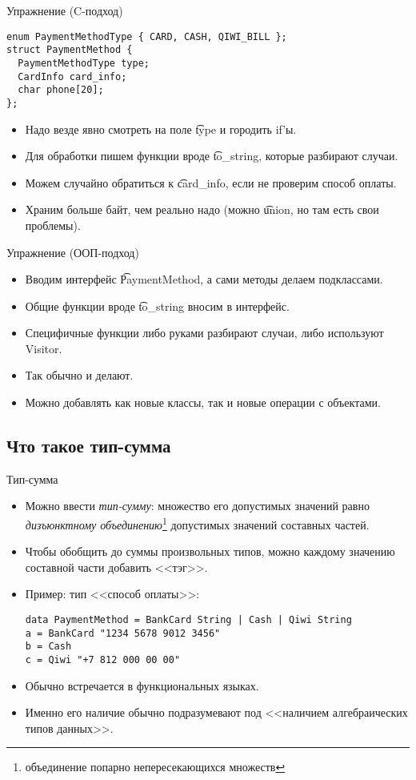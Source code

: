 \begin{frame}[fragile]{Упражнение (C-подход)}
\begin{verbatim}
enum PaymentMethodType { CARD, CASH, QIWI_BILL };
struct PaymentMethod {
  PaymentMethodType type;
  CardInfo card_info;
  char phone[20];
};
\end{verbatim}
	\begin{itemize}
		\item Надо везде явно смотреть на поле \t{type} и городить if'ы.
		\item Для обработки пишем функции вроде \t{to\_string}, которые разбирают случаи.
		\item Можем случайно обратиться к \t{card\_info}, если не проверим способ оплаты.
		\item Храним больше байт, чем реально надо (можно \t{union}, но там есть свои проблемы).
	\end{itemize}
\end{frame}

\begin{frame}{Упражнение (ООП-подход)}
	\begin{itemize}
		\item Вводим интерфейс \t{PaymentMethod}, а сами методы делаем подклассами.
		\item Общие функции вроде \t{to\_string} вносим в интерфейс.
		\item Специфичные функции либо руками разбирают случаи, либо используют Visitor.
		\item Так обычно и делают.
		\item Можно добавлять как новые классы, так и новые операции с объектами.
	\end{itemize}
\end{frame}

\subsection{Что такое тип-сумма}
\begin{frame}[fragile]{Тип-сумма}
	\begin{itemize}
		\item Можно ввести \textit{тип-сумму}: множество его допустимых значений равно \textit{дизъюнктному объединению}\footnote{объединение попарно непересекающихся множеств} допустимых значений составных частей.
		\item Чтобы обобщить до суммы произвольных типов, можно каждому значению составной части добавить <<тэг>>.
		\item Пример: тип <<способ оплаты>>:
\begin{verbatim}
data PaymentMethod = BankCard String | Cash | Qiwi String
a = BankCard "1234 5678 9012 3456"
b = Cash
c = Qiwi "+7 812 000 00 00"
\end{verbatim}
		\item Обычно встречается в функциональных языках.
		\item Именно его наличие обычно подразумевают под <<наличием алгебраических типов данных>>.
	\end{itemize}
\end{frame}


